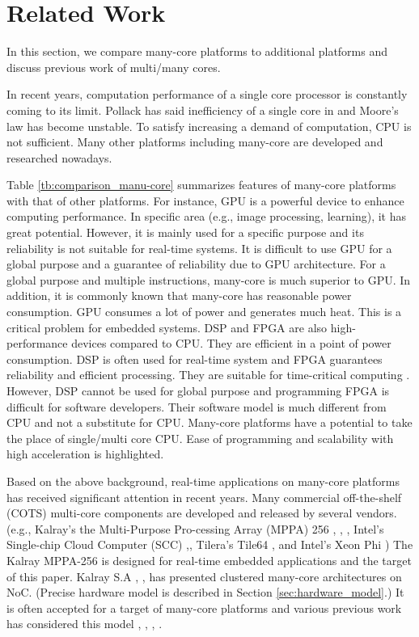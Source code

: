 \documentclass{sig-alternate-05-2015}
\begin{document}
\section{Related Work}
\label{sec:related work}
In this section, we compare many-core platforms to additional platforms and discuss previous work of multi/many cores.

In recent years, computation performance of a single core processor is constantly coming to its limit.
Pollack has said inefficiency of a single core in \cite{pollack1999new} and Moore's law \cite{moore2006cramming} has become unstable.
To satisfy increasing a demand of computation, CPU is not sufficient.
Many other platforms including many-core are developed and researched nowadays.

Table \ref{tb:comparison_manu-core} summarizes features of many-core platforms with that of other platforms.
For instance, GPU is a powerful device to enhance computing performance.
In specific area (e.g., image processing, learning), it has great potential.
However, it is mainly used for a specific purpose and its reliability is not suitable for real-time systems.
It is difficult to use GPU for a global purpose and a guarantee of reliability due to GPU architecture.
For a global purpose and multiple instructions, many-core is much superior to GPU.
In addition, it is commonly known that many-core has reasonable power consumption.
GPU consumes a lot of power and generates much heat.
This is a critical problem for embedded systems.
DSP and FPGA are also high-performance devices compared to CPU.
They are efficient in a point of power consumption.
DSP is often used for real-time system and FPGA guarantees reliability and efficient processing.
They are suitable for time-critical computing \cite{de2015kalray}.
However, DSP cannot be used for global purpose and programming FPGA is difficult for software developers.
Their software model is much different from CPU and not a substitute for CPU.
Many-core platforms have a potential to take the place of single/multi core CPU.
Ease of programming and scalability with high acceleration is highlighted.

Based on the above background, real-time applications on many-core platforms has received significant attention in recent years.
Many commercial off-the-shelf (COTS) multi-core components are developed and released by several vendors.
(e.g., Kalray's the Multi-Purpose Pro-cessing Array (MPPA) 256 \cite{de2013distributed}, \cite{de2013clustered}, \cite{de2014time},
Intel's Single-chip Cloud Computer (SCC) \cite{intel2015scc},\cite{baron2010single}, Tilera's Tile64 \cite{tilera2015tile64}, and
Intel's Xeon Phi \cite{chrysos2014intel} \cite{chrysos2012intel})
The Kalray MPPA-256 is designed for real-time embedded applications and the target of this paper.
Kalray S.A \cite{de2013distributed}, \cite{de2013clustered}, \cite{de2014time} has presented clustered many-core architectures on NoC.
(Precise hardware model is described in Section \ref{sec:hardware_model}.)
It is often accepted for a target of many-core platforms and various previous work has considered this model \cite{perret2016temporal}, \cite{becker2016contention}, \cite{carle2014static}, \cite{perret2016mapping}.
\end{document}
